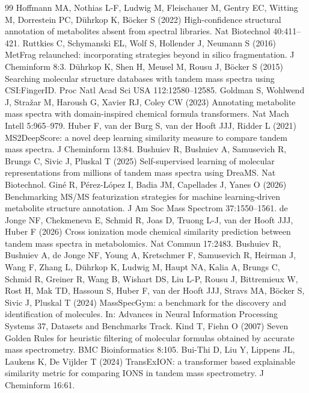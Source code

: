 \documentclass[11pt]{article}
\begin{document}
\begin{thebibliography}{99}
\small
{} Hoffmann MA, Nothias L-F, Ludwig M, Fleischauer M, Gentry EC, Witting M, Dorrestein PC, D\"uhrkop K, B\"ocker S (2022) High-confidence structural annotation of metabolites absent from spectral libraries. Nat Biotechnol 40:411--421.
 Ruttkies C, Schymanski EL, Wolf S, Hollender J, Neumann S (2016) MetFrag relaunched: incorporating strategies beyond in silico fragmentation. J Cheminform 8:3.
 D\"uhrkop K, Shen H, Meusel M, Rousu J, B\"ocker S (2015) Searching molecular structure databases with tandem mass spectra using CSI:FingerID. Proc Natl Acad Sci USA 112:12580--12585.
 Goldman S, Wohlwend J, Stra\v{z}ar M, Haroush G, Xavier RJ, Coley CW (2023) Annotating metabolite mass spectra with domain-inspired chemical formula transformers. Nat Mach Intell 5:965--979.
 Huber F, van der Burg S, van der Hooft JJJ, Ridder L (2021) MS2DeepScore: a novel deep learning similarity measure to compare tandem mass spectra. J Cheminform 13:84.
 Bushuiev R, Bushuiev A, Samusevich R, Brungs C, Sivic J, Pluskal T (2025) Self-supervised learning of molecular representations from millions of tandem mass spectra using DreaMS. Nat Biotechnol.
 Gin\'e R, P\'erez-L\'opez I, Badia JM, Capellades J, Yanes O (2026) Benchmarking MS/MS featurization strategies for machine learning-driven metabolite structure annotation. J Am Soc Mass Spectrom 37:1550--1561.
 de Jonge NF, Chekmeneva E, Schmid R, Joas D, Truong L-J, van der Hooft JJJ, Huber F (2026) Cross ionization mode chemical similarity prediction between tandem mass spectra in metabolomics. Nat Commun 17:2483.
 Bushuiev R, Bushuiev A, de Jonge NF, Young A, Kretschmer F, Samusevich R, Heirman J, Wang F, Zhang L, D\"uhrkop K, Ludwig M, Haupt NA, Kalia A, Brungs C, Schmid R, Greiner R, Wang B, Wishart DS, Liu L-P, Rousu J, Bittremieux W, Rost H, Mak TD, Hassoun S, Huber F, van der Hooft JJJ, Stravs MA, B\"ocker S, Sivic J, Pluskal T (2024) MassSpecGym: a benchmark for the discovery and identification of molecules. In: Advances in Neural Information Processing Systems 37, Datasets and Benchmarks Track.
 Kind T, Fiehn O (2007) Seven Golden Rules for heuristic filtering of molecular formulas obtained by accurate mass spectrometry. BMC Bioinformatics 8:105.
 Bui-Thi D, Liu Y, Lippens JL, Laukens K, De Vijlder T (2024) TransExION: a transformer based explainable similarity metric for comparing IONS in tandem mass spectrometry. J Cheminform 16:61.
\end{thebibliography}
\end{document}
